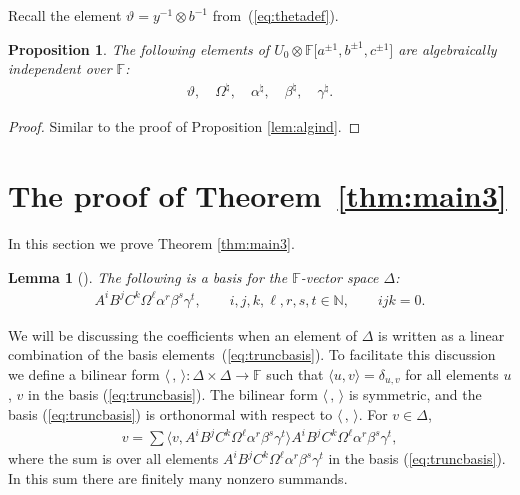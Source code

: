 \documentclass[pdftex]{sigma}
\numberwithin{equation}{section}
\newtheorem{Lemma}[Theorem]{Lemma}
\newtheorem{Proposition}[Theorem]{Proposition}
{\theoremstyle{definition}
\newtheorem{Note}[Theorem]{Note}
\newtheorem{Definition}[Theorem]{Definition}
\newtheorem{Problem}[Theorem]{Problem}
}
\begin{document}
 Recall the element
$\vartheta = y^{-1} \otimes b^{-1}$ from~(\ref{eq:thetadef}).

\begin{Proposition}
\label{lem:algind2}
The following elements of
$U_0\otimes
\mathbb F \lbrack a^{\pm 1}, b^{\pm 1}, c^{\pm 1}\rbrack $
are algebraically independent over $\mathbb F$:
\begin{gather*}
\vartheta, \quad \Omega^\natural,
\quad
\alpha^\natural,
\quad
\beta^\natural,
\quad
\gamma^\natural.
\end{gather*}
\end{Proposition}
\begin{proof}
Similar to the proof of
Proposition
\ref{lem:algind}.
\end{proof}


\section{The proof of Theorem~\ref{thm:main3}}\label{section9}

In this section we prove
Theorem
\ref{thm:main3}.

\begin{Lemma}[]
\label{lem:altbasisdelta}
The following is a basis for the $\mathbb F$-vector space
$\Delta$:
\begin{gather}
A^iB^jC^k\Omega^\ell \alpha^r \beta^s \gamma^t, \qquad
i,j,k,\ell, r,s,t\in \mathbb N,
\qquad   ijk=0.
\label{eq:truncbasis}
\end{gather}
\end{Lemma}


 We will be discussing
 the coef\/f\/icients
when an element of $\Delta$ is written as a linear
combination of the basis elements~(\ref{eq:truncbasis}). To facilitate this discussion
we def\/ine a bilinear form
$\langle \,,\,\rangle : \Delta \times \Delta \to \mathbb F$
such that $\langle u,v\rangle = \delta_{u,v}$
for all elements $u$, $v$ in the basis
(\ref{eq:truncbasis}). The bilinear form
$\langle\,,\,\rangle$ is symmetric, and
the basis
(\ref{eq:truncbasis}) is
orthonormal with respect to
$\langle \,,\, \rangle $.
For $v \in \Delta$,
\begin{gather*}
v = \sum \langle v, A^iB^jC^k\Omega^\ell\alpha^r\beta^s\gamma^t \rangle
 A^iB^jC^k\Omega^\ell\alpha^r\beta^s\gamma^t,
\label{eq:truncbilsum}
\end{gather*}
where the sum is over all elements
 $A^iB^jC^k\Omega^\ell\alpha^r\beta^s\gamma^t$ in the basis
(\ref{eq:truncbasis}). In this sum there are f\/initely
many nonzero summands.
\end{document}
